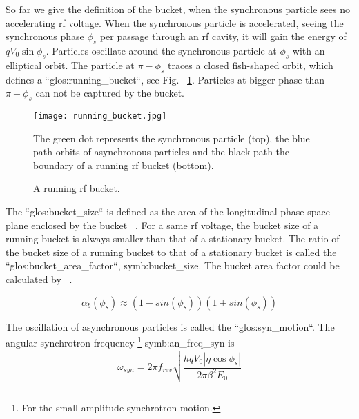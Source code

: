 So far we give the definition of the bucket, when the synchronous particle sees no accelerating rf voltage. When the synchronous particle is accelerated, seeing the synchronous phase $\phi_{\mathit{s}}$ per passage through an rf cavity, it will gain the energy of $qV_0\sin\phi_{\mathit{s}}$. %
Particles oscillate around the synchronous particle at $\phi_{\mathit{s}}$ with an elliptical orbit. The particle at $\pi-\phi_{\mathit{s}}$ traces a closed fish-shaped orbit, which defines a ``\gls{glos:running_bucket}``, see Fig. ~\ref{running_bucket}. Particles at bigger phase than $\pi-\phi_{\mathit{s}}$ can not be captured by the bucket.
\begin{figure}[!htb]
   \centering   
   \texttt{[image: running\_bucket.jpg]}
   \caption{A running rf bucket.}{The green dot represents the synchronous particle (top), the blue path orbits of asynchronous particles and the black path the boundary of a running rf bucket (bottom).}
   \label{running_bucket}
\end{figure} 

The ``\gls{glos:bucket_size}`` is defined as the area of the longitudinal phase space plane enclosed by the bucket ~\cite{lee_accelerator_2011}. For a same rf voltage, the bucket size of a running bucket is always smaller than that of a stationary bucket. The ratio of the bucket size of a running bucket to that of a stationary bucket is called the ``\gls{glos:bucket_area_factor}``, \gls{symb:bucket_size}. The bucket area factor could be calculated by ~\cite{lee_accelerator_2011}.

\begin{equation}
\alpha_b(\phi_{s})\approx(1-sin(\phi_{s}))(1+sin(\phi_{s}))
\label{eq:buckt_area_factor}
\end{equation} 

The oscillation of asynchronous particles is called the ``\gls{glos:syn_motion}``. The angular synchrotron frequency \footnote{For the small-amplitude synchrotron motion.} \gls{symb:an_freq_syn} is ~\cite{lee_accelerator_2011}
\begin{equation}
\omega_{\mathit{syn}}=2\pi f_{\mathit{rev}}\sqrt{\frac{hqV_0|\eta\cos\phi_{s}|}{2\pi\beta^2E_0}}
\label{eq:synchfreq}
\end{equation} 

